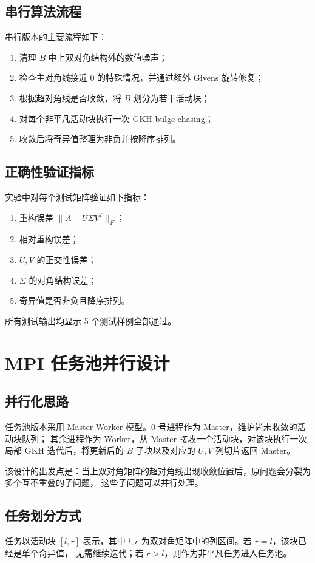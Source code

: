 \documentclass[UTF8,a4paper,10pt]{ctexart}
\begin{document}
\subsection{串行算法流程}
串行版本的主要流程如下：
\begin{enumerate}
  \item 清理 $B$ 中上双对角结构外的数值噪声；
  \item 检查主对角线接近 0 的特殊情况，并通过额外 Givens 旋转修复；
  \item 根据超对角线是否收敛，将 $B$ 划分为若干活动块；
  \item 对每个非平凡活动块执行一次 GKH bulge chasing；
  \item 收敛后将奇异值整理为非负并按降序排列。
\end{enumerate}

\subsection{正确性验证指标}
实验中对每个测试矩阵验证如下指标：
\begin{enumerate}
  \item 重构误差 $\|A-U\Sigma V^T\|_F$；
  \item 相对重构误差；
  \item $U,V$ 的正交性误差；
  \item $\Sigma$ 的对角结构误差；
  \item 奇异值是否非负且降序排列。
\end{enumerate}
所有测试输出均显示 5 个测试样例全部通过。

\section{MPI 任务池并行设计}

\subsection{并行化思路}
任务池版本采用 Master-Worker 模型。0 号进程作为 Master，维护尚未收敛的活动块队列；
其余进程作为 Worker，从 Master 接收一个活动块，对该块执行一次局部 GKH 迭代后，将更新后的
$B$ 子块以及对应的 $U,V$ 列切片返回 Master。

该设计的出发点是：当上双对角矩阵的超对角线出现收敛位置后，原问题会分裂为多个互不重叠的子问题，
这些子问题可以并行处理。

\subsection{任务划分方式}
任务以活动块 $[l,r]$ 表示，其中 $l,r$ 为双对角矩阵中的列区间。若 $r=l$，该块已经是单个奇异值，
无需继续迭代；若 $r>l$，则作为非平凡任务进入任务池。
\end{document}
